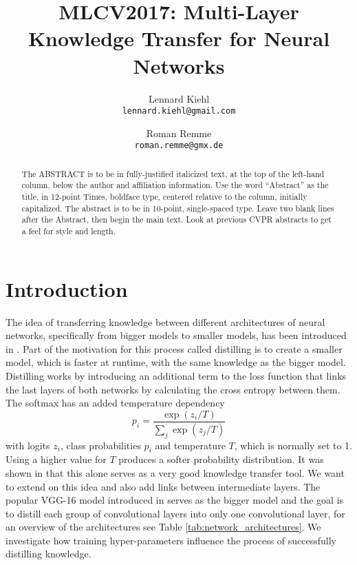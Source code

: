 \documentclass[10pt,twocolumn,letterpaper]{article}
\begin{document}
\title{MLCV2017: Multi-Layer Knowledge Transfer for Neural Networks}

\author{Lennard Kiehl\\
{\tt\small lennard.kiehl@gmail.com}
\and
Roman Remme\\
{\tt\small roman.remme@gmx.de}
}

\maketitle

\begin{abstract}
   The ABSTRACT is to be in fully-justified italicized text, at the top
   of the left-hand column, below the author and affiliation
   information. Use the word ``Abstract'' as the title, in 12-point
   Times, boldface type, centered relative to the column, initially
   capitalized. The abstract is to be in 10-point, single-spaced type.
   Leave two blank lines after the Abstract, then begin the main text.
   Look at previous CVPR abstracts to get a feel for style and length.
\end{abstract}

\section{Introduction}

The idea of transferring knowledge between different architectures of neural networks, specifically from bigger models to smaller models, has been introduced in \cite{hinton2015distilling}. Part of the motivation for this process called distilling is to create a smaller model, which is faster at runtime, with the same knowledge as the bigger model. Distilling works by introducing an additional term to the loss function that links the last layers of both networks by calculating the cross entropy between them. The softmax has an added temperature dependency
\begin{equation}
	p_i = \frac{\exp(z_i / T)}{\sum_j \exp(z_j/T)}
\end{equation}
with logits $z_i$, class probabilities $p_i$ and temperature $T$, which is normally set to 1. Using a higher value for $T$ produces a softer probability distribution.
It was shown in \cite{hinton2015distilling} that this alone serves as a very good knowledge transfer tool. We want to extend on this idea and also add links between intermediate layers. The popular VGG-16 model introduced in \cite{DBLP:journals/corr/SimonyanZ14a} serves as the bigger model and the goal is to distill each group of convolutional layers into only one convolutional layer, for an overview of the architectures see Table \ref{tab:network_architectures}. We investigate how training hyper-parameters influence the process of successfully distilling knowledge.
\end{document}
